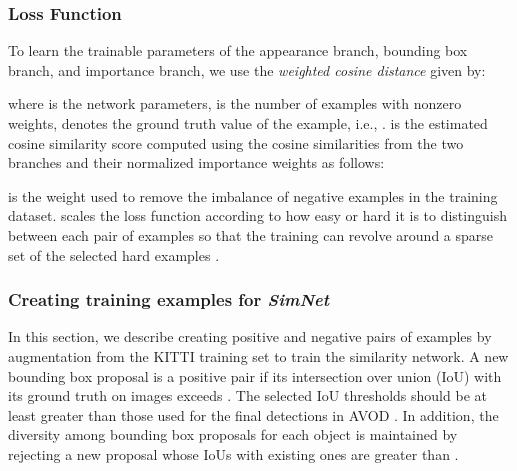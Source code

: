 \documentclass[letterpaper, 10 pt, conference]{ieeeconf}
\begin{document}
\subsubsection{Loss Function} \label{training_siamese}
To learn the trainable parameters of the appearance branch, bounding box branch, and importance branch, we use the \textit{weighted cosine distance} given by:

\noindent
where  is the network parameters,  is the number of examples with nonzero weights,  denotes the ground truth value of  the  example, i.e., .  is the estimated cosine similarity score computed using the cosine similarities from the two branches and their normalized importance weights as follows:

\noindent
 is the weight used to remove the imbalance of negative examples in the training dataset.  scales the loss function according to how easy or hard it is to distinguish between each pair of examples so that the training can revolve around a sparse set of the selected hard examples \cite{Focal_loss}.


\subsubsection{Creating training examples for \textit{SimNet}} In this section, we describe creating positive and negative pairs of examples by augmentation from the KITTI training set to train the similarity network. A new bounding box proposal is a positive pair if its intersection over union (IoU) with its ground truth on images exceeds . The selected IoU thresholds should be at least greater than those used for the final detections in AVOD  \cite{AVOD}. In addition, the diversity among bounding box proposals for each object is maintained by rejecting a new proposal whose IoUs with existing ones are greater than .
\end{document}
